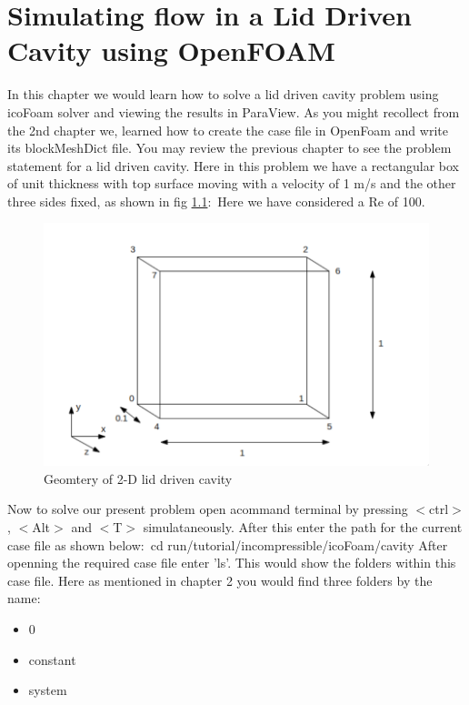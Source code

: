 \documentclass[a4paper,12pt]{report}
\begin{document}
\setcounter{chapter}{3}
\chapter{Simulating flow in a Lid Driven Cavity using OpenFOAM}
\flushleft In this chapter we would learn how to solve a lid driven cavity problem using icoFoam solver and viewing the results in ParaView. As you might recollect from the 2nd chapter we, learned how to create the case file in OpenFoam and write its blockMeshDict file.
\flushleft You may review the previous chapter to see the problem statement for a lid driven cavity. Here in this problem we have a rectangular box of unit thickness with top surface moving with a velocity of 1 m/s and the other three sides fixed, as shown in fig \ref{geometry}$:$ 
\flushleft Here we have considered a Re of 100.

\begin{figure}[ht]  
\begin{center}  
\includegraphics[scale=0.4]{geometry.png}
\caption{Geomtery of 2-D lid driven cavity}
\label{geometry}
\end{center}  
\end{figure}

\flushleft Now to solve our present problem open acommand terminal by pressing $<$ctrl$>$, $<$Alt$>$ and $<$T$>$ simulataneously. After this enter the path for the current case file as shown below$:$
\flushleft cd run/tutorial/incompressible/icoFoam/cavity
\flushleft After openning the required case file enter 'ls'. This would show the folders within this case file. Here as mentioned in chapter 2 you would find three folders by the name$:$

\begin{itemize}
  \item 0
  \item constant
  \item system
\end{itemize}
\end{document}
